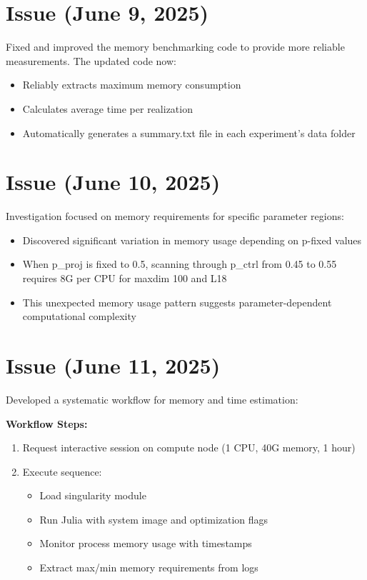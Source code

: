 \documentclass[11pt,a4paper]{article}
\begin{document}
\section{Issue (June 9, 2025)}

Fixed and improved the memory benchmarking code to provide more reliable measurements. The updated code now:
\begin{itemize}
    \item Reliably extracts maximum memory consumption
    \item Calculates average time per realization
    \item Automatically generates a summary.txt file in each experiment's data folder
\end{itemize}

\section{Issue (June 10, 2025)}

Investigation focused on memory requirements for specific parameter regions:
\begin{itemize}
    \item Discovered significant variation in memory usage depending on p-fixed values
    \item When p\_proj is fixed to 0.5, scanning through p\_ctrl from 0.45 to 0.55 requires 8G per CPU for maxdim 100 and L18
    \item This unexpected memory usage pattern suggests parameter-dependent computational complexity
\end{itemize}

\section{Issue (June 11, 2025)}

Developed a systematic workflow for memory and time estimation:

\textbf{Workflow Steps:}
\begin{enumerate}
    \item Request interactive session on compute node (1 CPU, 40G memory, 1 hour)
    \item Execute sequence:
    \begin{itemize}
        \item Load singularity module
        \item Run Julia with system image and optimization flags
        \item Monitor process memory usage with timestamps
        \item Extract max/min memory requirements from logs
    \end{itemize}
\end{enumerate}
\end{document}
